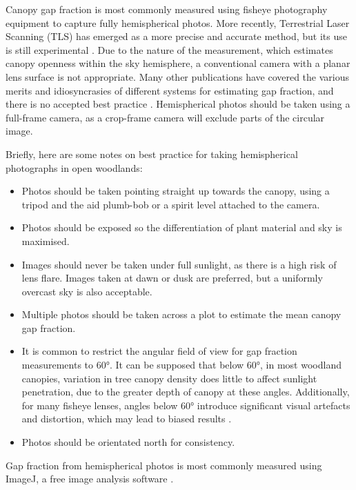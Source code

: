 \documentclass[11pt,a4paper]{article}
\begin{document}
Canopy gap fraction is most commonly measured using fisheye photography equipment to capture fully hemispherical photos. More recently, Terrestrial Laser Scanning (TLS) has emerged as a more precise and accurate method, but its use is still experimental \citep{Calders2020}. Due to the nature of the measurement, which estimates canopy openness within the sky hemisphere, a conventional camera with a planar lens surface is not appropriate. Many other publications have covered the various merits and idiosyncrasies of different systems for estimating gap fraction, and there is no accepted best practice \citep{Macfarlane2014, Brusa2014, Jonckheere2005, Paletto2009, Seidel2011}. Hemispherical photos should be taken using a full-frame camera, as a crop-frame camera will exclude parts of the circular image.

Briefly, here are some notes on best practice for taking hemispherical photographs in open woodlands:

\begin{itemize}
	\item{Photos should be taken pointing straight up towards the canopy, using a tripod and the aid plumb-bob or a spirit level attached to the camera.} 
	\item{Photos should be exposed so the differentiation of plant material and sky is maximised.}
	\item{Images should never be taken under full sunlight, as there is a high risk of lens flare. Images taken at dawn or dusk are preferred, but a uniformly overcast sky is also acceptable.} 
	\item{Multiple photos should be taken across a plot to estimate the mean canopy gap fraction.} 
	\item{It is common to restrict the angular field of view for gap fraction measurements to 60\si{\degree}. It can be supposed that below 60\si{\degree}, in most woodland canopies, variation in tree canopy density does little to affect sunlight penetration, due to the greater depth of canopy at these angles. Additionally, for many fisheye lenses, angles below 60\si{\degree} introduce significant visual artefacts and distortion, which may lead to biased results \citep{Jupp2008}.}
	\item{Photos should be orientated north for consistency.}
\end{itemize}

Gap fraction from hemispherical photos is most commonly measured using ImageJ, a free image analysis software \citep{Schneider2012}. 
	
\end{document}
